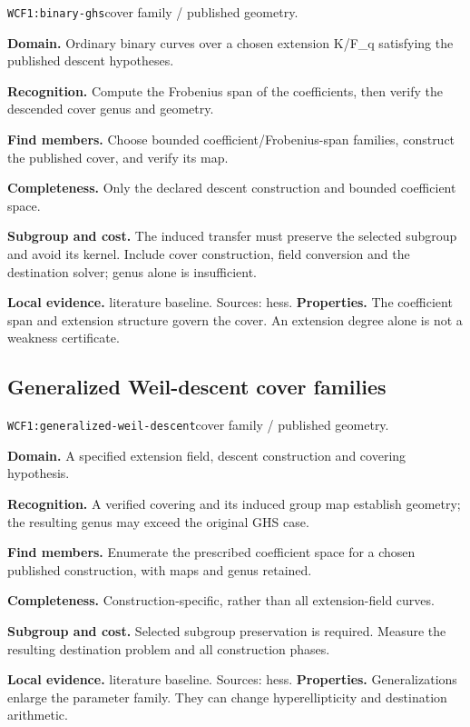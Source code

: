 \documentclass[10pt]{article}
\begin{document}
\texttt{WCF1:binary-ghs}\quad cover family / published geometry.\par
\textbf{Domain.} Ordinary binary curves over a chosen extension K/F\_q satisfying the published descent hypotheses.\par
\textbf{Recognition.} Compute the Frobenius span of the coefficients, then verify the descended cover genus and geometry.\par
\textbf{Find members.} Choose bounded coefficient/Frobenius-span families, construct the published cover, and verify its map.\par
\textbf{Completeness.} Only the declared descent construction and bounded coefficient space.\par
\textbf{Subgroup and cost.} The induced transfer must preserve the selected subgroup and avoid its kernel. Include cover construction, field conversion and the destination solver; genus alone is insufficient.\par
\textbf{Local evidence.} literature baseline. Sources: hess.
\textbf{Properties.} The coefficient span and extension structure govern the cover. An extension degree alone is not a weakness certificate.\par
{}\subsection{Generalized Weil-descent cover families}
\texttt{WCF1:generalized-weil-descent}\quad cover family / published geometry.\par
\textbf{Domain.} A specified extension field, descent construction and covering hypothesis.\par
\textbf{Recognition.} A verified covering and its induced group map establish geometry; the resulting genus may exceed the original GHS case.\par
\textbf{Find members.} Enumerate the prescribed coefficient space for a chosen published construction, with maps and genus retained.\par
\textbf{Completeness.} Construction-specific, rather than all extension-field curves.\par
\textbf{Subgroup and cost.} Selected subgroup preservation is required. Measure the resulting destination problem and all construction phases.\par
\textbf{Local evidence.} literature baseline. Sources: hess.
\textbf{Properties.} Generalizations enlarge the parameter family. They can change hyperellipticity and destination arithmetic.\par
\end{document}
